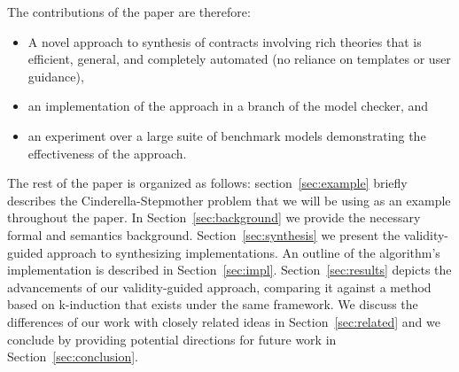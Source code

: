 The contributions of the paper are therefore: 
\begin{itemize}
    \item A novel approach to synthesis of contracts involving rich theories that is efficient, general, and completely automated (no reliance on templates or user guidance), 
    \item an implementation of the approach in a branch of the \jkind model checker, and 
    \item an experiment over a large suite of benchmark models demonstrating the effectiveness of the approach.
\end{itemize}

The rest of the paper is organized as follows: section~\ref{sec:example} briefly describes the Cinderella-Stepmother problem that we will be using as an example throughout the paper. In Section~\ref{sec:background} we provide the necessary formal and semantics background. Section~\ref{sec:synthesis} we present the validity-guided approach to synthesizing implementations.
An outline of the algorithm's implementation is described in Section~\ref{sec:impl}. Section~\ref{sec:results} depicts the advancements of our validity-guided
approach, comparing it against a method based on k-induction that exists under the same framework. We discuss the differences of our work with closely related ideas in Section~\ref{sec:related} and we conclude by providing potential directions for future work in Section~\ref{sec:conclusion}.

	
